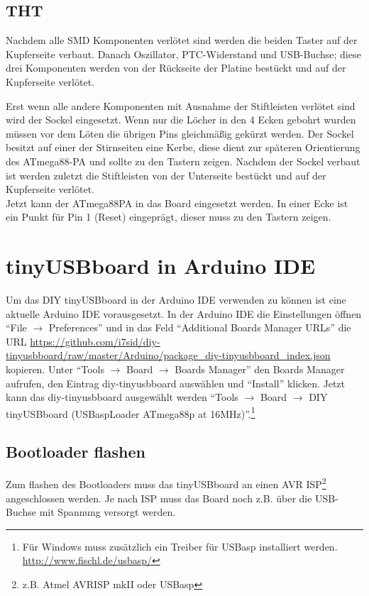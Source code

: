 \subsection{THT}
Nachdem alle SMD Komponenten verlötet sind werden die beiden Taster auf der Kupferseite verbaut.
Danach Oszillator, PTC-Widerstand und USB-Buchse; diese drei Komponenten werden von der Rückseite der Platine bestückt und auf der Kupferseite verlötet.

Erst wenn alle andere Komponenten mit Ausnahme der Stiftleisten verlötet sind wird der Sockel eingesetzt. Wenn nur die Löcher in den 4 Ecken gebohrt wurden müssen vor dem Löten die übrigen Pins gleichmäßig gekürzt werden. Der Sockel besitzt auf einer der Stirnseiten eine Kerbe, diese dient zur späteren Orientierung des ATmega88-PA und sollte zu den Tastern zeigen.
Nachdem der Sockel verbaut ist werden zuletzt die Stiftleisten von der Unterseite bestückt und auf der Kupferseite verlötet.\\
Jetzt kann der ATmega88PA in das Board eingesetzt werden. In einer Ecke ist ein Punkt für Pin 1 (Reset) eingeprägt, dieser muss zu den Tastern zeigen.

\section{tinyUSBboard in Arduino IDE}
Um das DIY tinyUSBboard in der Arduino IDE verwenden zu können ist eine aktuelle Arduino IDE vorausgesetzt. In der Arduino IDE die Einstellungen öffnen \enquote{File $\rightarrow$ Preferences} und in das Feld \enquote{Additional Boards Manager URLs} die URL \url{https://github.com/i7sid/diy-tinyusbboard/raw/master/Arduino/package_diy-tinyusbboard_index.json} kopieren. Unter \enquote{Tools $\rightarrow$ Board $\rightarrow$ Boards Manager} den Boards Manager aufrufen, den Eintrag diy-tinyusbboard auswählen und \enquote{Install} klicken. Jetzt kann das diy-tinyusbboard ausgewählt werden \enquote{Tools $\rightarrow$ Board $\rightarrow$ DIY tinyUSBboard (USBaspLoader ATmega88p at 16MHz)}.\footnote{Für Windows muss zusätzlich ein Treiber für USBasp installiert werden. \url{http://www.fischl.de/usbasp/}}
\subsection{Bootloader flashen}
Zum flashen des Bootloaders muss das tinyUSBboard an einen AVR ISP\footnote{z.B. Atmel AVRISP mkII oder USBasp} angeschlossen werden. Je nach ISP muss das Board noch z.B. über die USB-Buchse mit Spannung versorgt werden.

